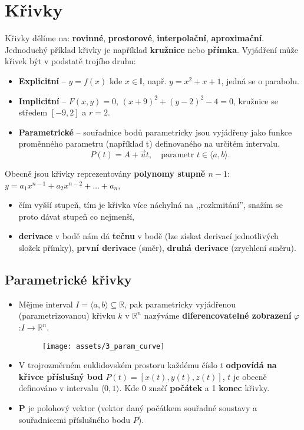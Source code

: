 \section{Křivky}
Křivky dělíme na: \textbf{rovinné}, \textbf{prostorové}, \textbf{interpolační}, \textbf{aproximační}. Jednoduchý příklad křivky je například \textbf{kružnice} nebo \textbf{přímka}. Vyjádření může křivek být v podstatě trojího druhu:
\begin{itemize}
    \item \textbf{Explicitní} -- $y = f(x)$  kde  $x  \in   \mathbb{I}$, např. $y = x^{2} + x + 1$, jedná se o parabolu.
    \item \textbf{Implicitní} -- $F(x, y) = 0$,  $(x+9)^{2} +(y −2)^{2} −4 = 0$, kružnice se středem $[−9, 2]$ a $r=2$.
    \item \textbf{Parametrické}	-- souřadnice bodů parametricky jsou vyjádřeny jako funkce proměnného parametru (například t) definovaného na určitém intervalu.
          \begin{equation*}
              P(t) = A + \vec{u}t, \quad \textrm{parametr }  t  \in \langle a, b \rangle.
          \end{equation*}
\end{itemize}

\noindent Obecně jsou křivky reprezentovány \textbf{polynomy stupně $ n - 1 $}: $y = a_1x^{n - 1} + a_2x^{n - 2} + \ldots + a_n$,
\begin{itemize}
    \item čím vyšší stupeň, tím je křivka více náchylná na ,,rozkmitání'', snažím se proto dávat stupeň co nejmenší,
    \item \textbf{derivace} v bodě nám dá \textbf{tečnu} v bodě (lze získat derivací jednotlivých složek přímky), \textbf{první derivace} (směr), \textbf{druhá derivace} (zrychlení směru).
\end{itemize}

\subsection{Parametrické křivky}
\begin{itemize}
    \item Mějme interval $I = \langle a, b \rangle \subseteq \mathbb{R}$, pak parametricky vyjádřenou (parametrizovanou) křivku $k$ v $\mathbb{R}^n$ nazýváme \textbf{diferencovatelné zobrazení} $\varphi$  :$I \rightarrow \mathbb{R}^n$.
          \begin{figure}[H]
              \centering
              \texttt{[image: assets/3\_param\_curve]}
          \end{figure}
    \item V trojrozměrném euklidovském prostoru každému číslo $t$ \textbf{odpovídá na křivce příslušný bod} $P(t) = [x(t), y(t), z(t)]$, $t$ je obecně definováno v intervalu $\langle 0, 1 \rangle$. Kde 0 značí \textbf{počátek} a 1 \textbf{konec} křivky.
    \item \textbf{P} je polohový vektor (vektor daný počátkem souřadné soustavy a souřadnicemi příslušného bodu $P$).
\end{itemize}

